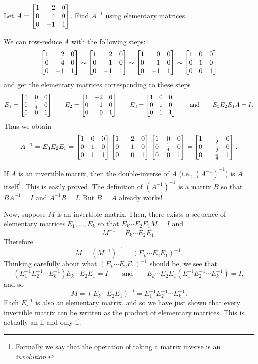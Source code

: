 \begin{example}
	Let $A=\mat{1&2&0\\0&4&0\\0&-1&1}$. Find $A^{-1}$ using elementary matrices.

	We can row-reduce $A$ with the following steps:
	\[
	    \mat{1&2&0\\0&4&0\\0&-1&1}\sim \mat{1&2&0\\0&1&0\\0&-1&1}\sim \mat{1&0&0\\0&1&0\\0&-1&1}\sim \mat{1&0&0\\0&1&0\\0&0&1} 
	\]
	and get the elementary matrices corresponding to these steps
	\[
	    E_1=\mat{1&0&0\\0&\frac{1}{4}&0\\0&0&1} \qquad E_2=\mat{1&-2&0\\0&1&0\\0&0&1}\qquad E_3=\mat{1&0&0\\0&1&0\\0&1&1}\qquad\text{and}\qquad E_3 E_2 E_1 A = I.
	\]
	Thus we obtain
	\[
	    A^{-1}=E_3 E_2 E_1 = \mat{1&0&0\\0&1&0\\0&1&1}\mat{1&-2&0\\0&1&0\\0&0&1}\mat{1&0&0\\0&\frac{1}{4}&0\\0&0&1} = \mat{1&-\frac{1}{2}&0\\ 0&\frac{1}{4}&0\\ 0&\frac{1}{4}&1}.
	\]
\end{example}


If $A$ is an invertible matrix, then the double-inverse of $A$ (i.e., $(A^{-1})^{-1}$) is $A$ itself\footnote{ Formally
we say that the operation of taking a matrix inverse is an \emph{involution}.}. This is easily proved. The definition of $(A^{-1})^{-1}$
is a matrix $B$ so that $BA^{-1}=I$ and $A^{-1}B=I$. But $B=A$ already works!

Now, suppose $M$ is an invertible matrix. Then, there exists a sequence of elementary matrices $E_1,\ldots, E_k$ so that
$E_k\cdots E_2E_1M=I$ and 
\[
	M^{-1}=E_k\cdots E_2E_1.
\]
Therefore 
\[
	M=(M^{-1})^{-1} = (E_k\cdots E_2E_1)^{-1}.
\]
Thinking carefully about what $(E_k\cdots E_2E_1)^{-1}$ should be, we see that 
\[
	(E_1^{-1}E_2^{-1}\cdots E_k^{-1})E_k\cdots E_2E_1=I\qquad\text{and}\qquad E_k\cdots E_2E_1(E_1^{-1}E_2^{-1}\cdots E_k^{-1})=I,
\]
and so
\[
	M=(E_k\cdots E_2E_1)^{-1}=E_1^{-1}E_2^{-1}\cdots E_k^{-1}.
\]
Each $E_i^{-1}$ is also an elementary matrix, and so we have just shown that every invertible matrix can
be written as the product of elementary matrices. This is actually an if and only if.

